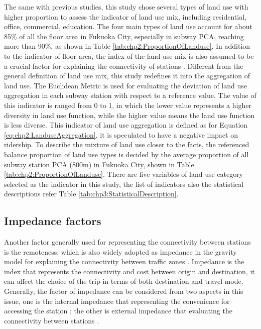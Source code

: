 %
The same with previous studies, this study chose several types of land use with higher proportion to assess the indicator of land use mix, including residential, office, commercial, education. The four main types of land use account for about 85\% of all the floor area in Fukuoka City, especially in subway PCA, reaching more than 90\%, as shown in Table \ref{tab:chp2:ProportionOfLanduse}. In addition to the indicator of floor area, the index of the land use mix is also assumed to be a crucial factor for explaining the connectivity of stations \cite{badoe2000transportation,cervero2004transit,frank2004obesity}. Different from the general definition of land use mix, this study redefines it into the aggregation of land use. The Euclidean Metric is used for evaluating the deviation of land use aggregation in each subway station with respect to a reference value. The value of this indicator is ranged from 0 to 1, in which the lower value represents a higher diversity in land use function, while the higher value means the land use function is less diverse. This indicator of land use aggregation is defined as for Equation \ref{eq:chp2:LanduseAggregation}, it is speculated to have a negative impact on ridership. To describe the mixture of land use closer to the facts, the referenced balance proportion of land use types is decided by the average proportion of all subway station PCA (800m) in Fukuoka City, shown in Table \ref{tab:chp2:ProportionOfLanduse}. There are five variables of land use category selected as the indicator in this study, the list of indicators also the statistical descriptions refer Table \ref{tab:chp3:StatisticalDescription}.

%
\subsection{Impedance factors}
%
Another factor generally used for representing the connectivity between stations is the remoteness, which is also widely adopted as impedance in the gravity model for explaining the connectivity between traffic zones \cite{iwanow2007trade,kepaptsoglou2010gravity,nitsch2000national}. Impedance is the index that represents the connectivity and cost between origin and destination, it can affect the choice of the trip in terms of both destination and travel mode. Generally, the factor of impedance can be considered from two aspects in this issue, one is the internal impedance that representing the convenience for accessing the station \cite{chu2004ridership,chakraborty2013land}; the other is external impedance that evaluating the connectivity between stations \cite{sohn2010factors}.

